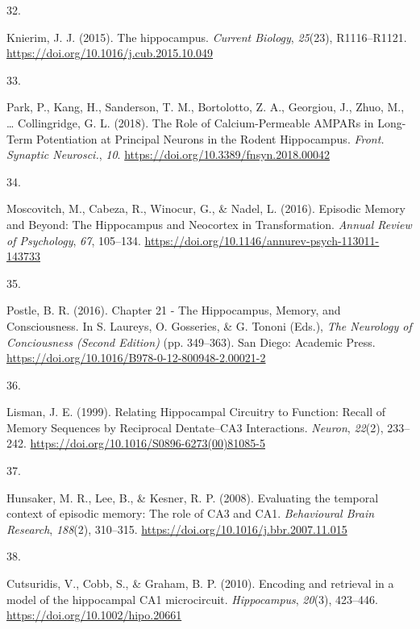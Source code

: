 \documentclass[
  11pt,
  letterpaper,
]{scrreprt}
\newlength{\cslhangindent}
\newlength{\csllabelwidth}
\newenvironment{CSLReferences}[2] %
 {\begin{list}{}{%
  \setlength{\itemindent}{0pt}
  \setlength{\leftmargin}{0pt}
  \setlength{\parsep}{0pt}
  \ifodd #1
   \setlength{\leftmargin}{\cslhangindent}
   \setlength{\itemindent}{-1\cslhangindent}
  \fi
  \setlength{\itemsep}{#2\baselineskip}}}
 {\end{list}}
\newcommand{\CSLLeftMargin}[1]{\parbox[t]{\csllabelwidth}{\strut#1\strut}}
\newcommand{\CSLRightInline}[1]{\parbox[t]{\linewidth - \csllabelwidth}{\strut#1\strut}}
\begin{document}
\begin{CSLReferences}{0}{0}
\CSLLeftMargin{32. }%
\CSLRightInline{Knierim, J. J. (2015). The hippocampus. \emph{Current
Biology}, \emph{25}(23), R1116--R1121.
\url{https://doi.org/10.1016/j.cub.2015.10.049}}

\CSLLeftMargin{33. }%
\CSLRightInline{Park, P., Kang, H., Sanderson, T. M., Bortolotto, Z. A.,
Georgiou, J., Zhuo, M., \ldots{} Collingridge, G. L. (2018). The {Role}
of {Calcium-Permeable AMPARs} in {Long-Term Potentiation} at {Principal
Neurons} in the {Rodent Hippocampus}. \emph{Front. Synaptic Neurosci.},
\emph{10}. \url{https://doi.org/10.3389/fnsyn.2018.00042}}

\CSLLeftMargin{34. }%
\CSLRightInline{Moscovitch, M., Cabeza, R., Winocur, G., \& Nadel, L.
(2016). Episodic {Memory} and {Beyond}: {The Hippocampus} and
{Neocortex} in {Transformation}. \emph{Annual Review of Psychology},
\emph{67}, 105--134.
\url{https://doi.org/10.1146/annurev-psych-113011-143733}}

\CSLLeftMargin{35. }%
\CSLRightInline{Postle, B. R. (2016). Chapter 21 - {The Hippocampus},
{Memory}, and {Consciousness}. In S. Laureys, O. Gosseries, \& G. Tononi
(Eds.), \emph{The {Neurology} of {Conciousness} ({Second Edition})} (pp.
349--363). San Diego: Academic Press.
\url{https://doi.org/10.1016/B978-0-12-800948-2.00021-2}}

\CSLLeftMargin{36. }%
\CSLRightInline{Lisman, J. E. (1999). Relating {Hippocampal Circuitry}
to {Function}: {Recall} of {Memory Sequences} by {Reciprocal
Dentate}--{CA3 Interactions}. \emph{Neuron}, \emph{22}(2), 233--242.
\url{https://doi.org/10.1016/S0896-6273(00)81085-5}}

\CSLLeftMargin{37. }%
\CSLRightInline{Hunsaker, M. R., Lee, B., \& Kesner, R. P. (2008).
Evaluating the temporal context of episodic memory: {The} role of {CA3}
and {CA1}. \emph{Behavioural Brain Research}, \emph{188}(2), 310--315.
\url{https://doi.org/10.1016/j.bbr.2007.11.015}}

\CSLLeftMargin{38. }%
\CSLRightInline{Cutsuridis, V., Cobb, S., \& Graham, B. P. (2010).
Encoding and retrieval in a model of the hippocampal CA1 microcircuit.
\emph{Hippocampus}, \emph{20}(3), 423--446.
\url{https://doi.org/10.1002/hipo.20661}}


\end{CSLReferences}
\end{document}
